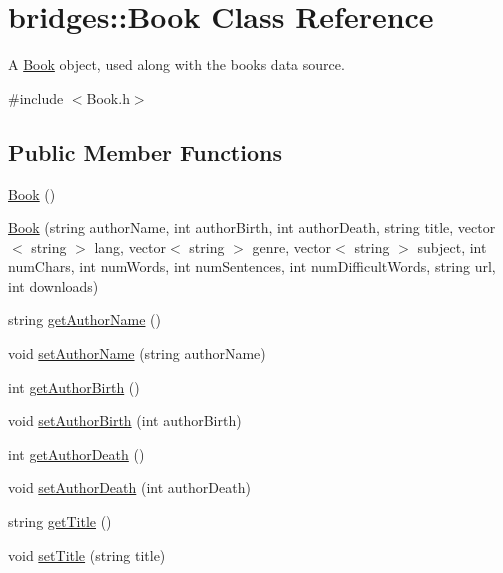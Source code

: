 \hypertarget{classbridges_1_1_book}{}\section{bridges\+:\+:Book Class Reference}
\label{classbridges_1_1_book}


A \mbox{\hyperlink{classbridges_1_1_book}{Book}} object, used along with the books data source.  




{\ttfamily \#include $<$Book.\+h$>$}

\subsection*{Public Member Functions}
\begin{DoxyCompactItemize}
\item 
\mbox{\hyperlink{classbridges_1_1_book_abb2903c640bd263a2e077d52e12a773e}{Book}} ()
\item 
\mbox{\hyperlink{classbridges_1_1_book_ac3060f3eaf757c82ea21f6501eb97b80}{Book}} (string author\+Name, int author\+Birth, int author\+Death, string title, vector$<$ string $>$ lang, vector$<$ string $>$ genre, vector$<$ string $>$ subject, int num\+Chars, int num\+Words, int num\+Sentences, int num\+Difficult\+Words, string url, int downloads)
\item 
string \mbox{\hyperlink{classbridges_1_1_book_a0204002c3242950404f348d5c5016693}{get\+Author\+Name}} ()
\item 
void \mbox{\hyperlink{classbridges_1_1_book_affc38232dda1e6b04d7e38a02cdd9c39}{set\+Author\+Name}} (string author\+Name)
\item 
int \mbox{\hyperlink{classbridges_1_1_book_aab2b100c668996d17c45817b81323d93}{get\+Author\+Birth}} ()
\item 
void \mbox{\hyperlink{classbridges_1_1_book_adca4d6766fa0068e23926ae95ed8411f}{set\+Author\+Birth}} (int author\+Birth)
\item 
int \mbox{\hyperlink{classbridges_1_1_book_a73014b2bb34b951d5ce5b4223c9fec8d}{get\+Author\+Death}} ()
\item 
void \mbox{\hyperlink{classbridges_1_1_book_a044ad1b1b6418d7545c6f957b2757bcd}{set\+Author\+Death}} (int author\+Death)
\item 
string \mbox{\hyperlink{classbridges_1_1_book_ab69bb95904587455af97c6fd6299bc1d}{get\+Title}} ()
\item 
void \mbox{\hyperlink{classbridges_1_1_book_a277540665913ac1a4a943af99dad46bb}{set\+Title}} (string title)

\end{DoxyCompactItemize}
